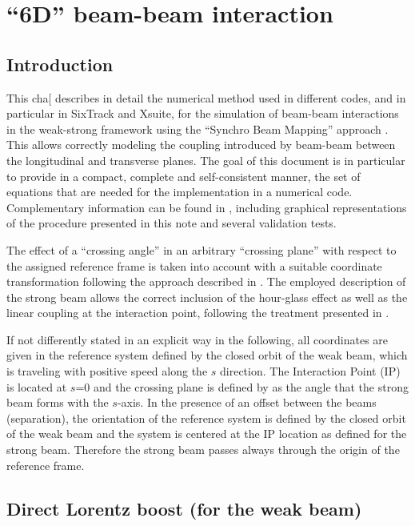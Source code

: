 \chapter{``6D'' beam-beam interaction}

\section{Introduction} 

This cha[ describes in detail the numerical method used in different codes, and in particular in SixTrack \cite{sixtracksite} and Xsuite, for the simulation of beam-beam interactions in the weak-strong framework using the ``Synchro Beam Mapping'' 
approach \cite{hirata1}.  This allows correctly modeling the coupling introduced by beam-beam between the longitudinal and transverse planes. The goal of this document is  in particular to provide in a compact, complete and self-consistent manner, the set of equations that are needed for the implementation in a numerical code. 
Complementary information can be found in \cite{bb6dslides}, including graphical representations of the procedure presented in this note and several validation tests.

The effect of a ``crossing angle'' in an arbitrary ``crossing plane'' with respect to the assigned reference frame is taken into account with a suitable coordinate transformation following the approach described in \cite{hirata, beam_beam}. The employed description of the strong beam allows the correct inclusion of the hour-glass effect as well as the linear coupling at the interaction point, following the treatment presented in \cite{beam_beam}. 


If not differently stated in an explicit way in the following, all coordinates are given in the reference system defined by the closed orbit of the weak beam, which is traveling with positive speed along the $s$ direction. The Interaction Point (IP) is located at $s$=0 and the crossing plane is defined by as the angle that the strong beam forms with the $s$-axis. In the presence of an offset between the beams (separation), the orientation of the reference system is defined by the closed orbit of the weak beam and the system is centered at the IP location as defined for the strong beam. Therefore the strong beam passes always through the origin of the reference frame.




\section{Direct Lorentz boost (for the weak beam)}
\label{sec:directboost}

